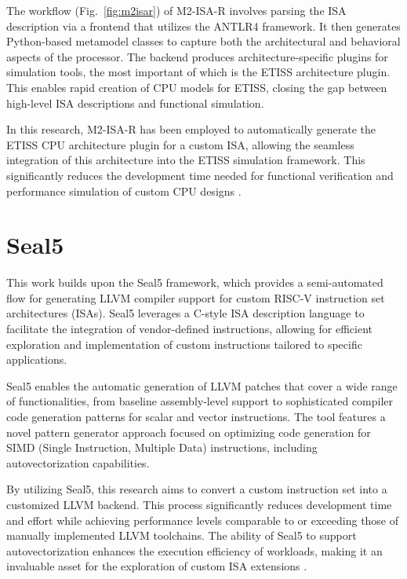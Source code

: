 The workflow (Fig.~\ref{fig:m2isar}) of M2-ISA-R involves parsing the ISA description via a frontend that utilizes the ANTLR4 framework. It then generates Python-based metamodel classes to capture both the architectural and behavioral aspects of the processor. The backend produces architecture-specific plugins for simulation tools, the most important of which is the ETISS architecture plugin. This enables rapid creation of CPU models for ETISS, closing the gap between high-level ISA descriptions and functional simulation.

In this research, M2-ISA-R has been employed to automatically generate the ETISS CPU architecture plugin for a custom ISA, allowing the seamless integration of this architecture into the ETISS simulation framework. This significantly reduces the development time needed for functional verification and performance simulation of custom CPU designs \cite{RISCVSimulation}.

\section{Seal5}

This work builds upon the Seal5 framework, which provides a semi-automated flow for generating LLVM compiler support for custom RISC-V instruction set architectures (ISAs). Seal5 leverages a C-style ISA description language to facilitate the integration of vendor-defined instructions, allowing for efficient exploration and implementation of custom instructions tailored to specific applications.

Seal5 enables the automatic generation of LLVM patches that cover a wide range of functionalities, from baseline assembly-level support to sophisticated compiler code generation patterns for scalar and vector instructions. The tool features a novel pattern generator approach focused on optimizing code generation for SIMD (Single Instruction, Multiple Data) instructions, including autovectorization capabilities.

By utilizing Seal5, this research aims to convert a custom instruction set into a customized LLVM backend. This process significantly reduces development time and effort while achieving performance levels comparable to or exceeding those of manually implemented LLVM toolchains. The ability of Seal5 to support autovectorization enhances the execution efficiency of workloads, making it an invaluable asset for the exploration of custom ISA extensions \cite{Seal5}.

